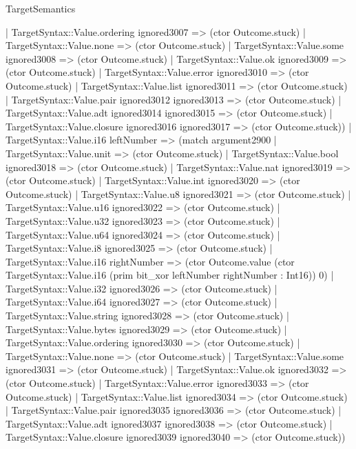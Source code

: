 \begin{lexlean}{TargetSemantics}
\begin{semanticmodule}
{              | TargetSyntax::Value.ordering ignored3007 => (ctor Outcome.stuck)
              | TargetSyntax::Value.none => (ctor Outcome.stuck)
              | TargetSyntax::Value.some ignored3008 => (ctor Outcome.stuck)
              | TargetSyntax::Value.ok ignored3009 => (ctor Outcome.stuck)
              | TargetSyntax::Value.error ignored3010 => (ctor Outcome.stuck)
              | TargetSyntax::Value.list ignored3011 => (ctor Outcome.stuck)
              | TargetSyntax::Value.pair ignored3012 ignored3013 => (ctor Outcome.stuck)
              | TargetSyntax::Value.adt ignored3014 ignored3015 => (ctor Outcome.stuck)
              | TargetSyntax::Value.closure ignored3016 ignored3017 => (ctor Outcome.stuck))
            | TargetSyntax::Value.i16 leftNumber => (match argument2900
              | TargetSyntax::Value.unit => (ctor Outcome.stuck)
              | TargetSyntax::Value.bool ignored3018 => (ctor Outcome.stuck)
              | TargetSyntax::Value.nat ignored3019 => (ctor Outcome.stuck)
              | TargetSyntax::Value.int ignored3020 => (ctor Outcome.stuck)
              | TargetSyntax::Value.u8 ignored3021 => (ctor Outcome.stuck)
              | TargetSyntax::Value.u16 ignored3022 => (ctor Outcome.stuck)
              | TargetSyntax::Value.u32 ignored3023 => (ctor Outcome.stuck)
              | TargetSyntax::Value.u64 ignored3024 => (ctor Outcome.stuck)
              | TargetSyntax::Value.i8 ignored3025 => (ctor Outcome.stuck)
              | TargetSyntax::Value.i16 rightNumber => (ctor Outcome.value (ctor TargetSyntax::Value.i16 (prim bit_xor leftNumber rightNumber : Int16)) 0)
              | TargetSyntax::Value.i32 ignored3026 => (ctor Outcome.stuck)
              | TargetSyntax::Value.i64 ignored3027 => (ctor Outcome.stuck)
              | TargetSyntax::Value.string ignored3028 => (ctor Outcome.stuck)
              | TargetSyntax::Value.bytes ignored3029 => (ctor Outcome.stuck)
              | TargetSyntax::Value.ordering ignored3030 => (ctor Outcome.stuck)
              | TargetSyntax::Value.none => (ctor Outcome.stuck)
              | TargetSyntax::Value.some ignored3031 => (ctor Outcome.stuck)
              | TargetSyntax::Value.ok ignored3032 => (ctor Outcome.stuck)
              | TargetSyntax::Value.error ignored3033 => (ctor Outcome.stuck)
              | TargetSyntax::Value.list ignored3034 => (ctor Outcome.stuck)
              | TargetSyntax::Value.pair ignored3035 ignored3036 => (ctor Outcome.stuck)
              | TargetSyntax::Value.adt ignored3037 ignored3038 => (ctor Outcome.stuck)
              | TargetSyntax::Value.closure ignored3039 ignored3040 => (ctor Outcome.stuck))
}
\end{semanticmodule}
\end{lexlean}
